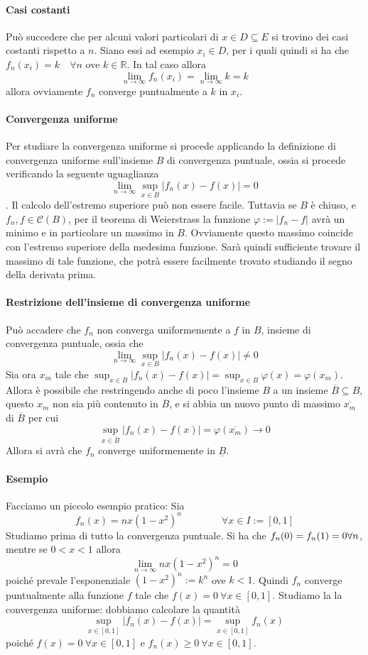 \documentclass[a4paper,12pt]{article}
\newcommand{\cont}{\mathscr{C}}
\begin{document}
\paragraph*{Casi costanti}
Può succedere che per alcuni valori particolari di $x\in D\subseteq E$ si trovino dei casi costanti rispetto a $n$. Siano essi ad esempio $x_i \in D$, per i quali quindi si ha che $f_n(x_i)=k \quad \forall n$  ove $k\in \mathbb{R}$. In tal caso allora 
$$\lim_{n\to\infty} f_n(x_i)=\lim_{n\to\infty} k = k $$
allora ovviamente $f_n$ converge puntualmente a $k$ in $x_i$.
\paragraph*{Convergenza uniforme}
Per studiare la convergenza uniforme si procede applicando la definizione di convergenza uniforme sull'insieme $B$ di convergenza puntuale, ossia si procede verificando la seguente uguaglianza
$$\lim_{n\to\infty} \sup_{x\in B} |f_n(x)- f(x)|=0$$.
Il calcolo dell'estremo superiore può non essere facile. Tuttavia se $B$ è chiuso, e $f_n, f \in\cont(B)$,   per il teorema di Weierstrass la funzione $\varphi:=|f_n-f|$ avrà un minimo e in particolare un massimo in $B$. Ovviamente questo massimo coincide con l'estremo superiore della medesima funzione. Sarà quindi sufficiente trovare il massimo di tale funzione, che potrà essere facilmente trovato studiando il segno della derivata prima.
\paragraph*{Restrizione dell'insieme di convergenza uniforme}
Può accadere che $f_n$ non converga uniformemente a $f$ in $B$, insieme di convergenza puntuale, ossia che 
$$\lim_{n\to\infty} \sup_{x\in B} |f_n(x)- f(x)|\neq 0$$
Sia ora $x_m$ tale che $\sup_{x\in B} |f_n(x)- f(x)|=\sup_{x\in B} \varphi(x)=\varphi (x_m)$. Allora è possibile che restringendo anche di poco l'insieme $B$ a un insieme $\overline{B}\subseteq B$, questo $x_m$ non sia più contenuto in $\overline{B}$, e si abbia un nuovo punto di massimo $\overline{x_m}$ di $\overline{B}$ per cui 
$$ \sup_{x\in \overline{B}} |f_n(x)- f(x)|=\varphi(\overline{x_m})\to 0 $$
Allora si avrà che $f_n$ converge uniformemente in $\underline{B}$.
\paragraph*{Esempio}
Facciamo un piccolo esempio pratico:
Sia $$f_n(x)= nx(1-x^2)^n \qquad \qquad \forall x\in I:=[0,1]$$
Studiamo prima di tutto la convergenza puntuale.
Si ha che $f_n(0)=f_n(1)=0 \\ \forall n$, mentre se $0<x<1$ allora 
$$\lim_{n\to\infty}nx(1-x^2)^n=0$$
poiché prevale l'esponenziale $(1-x^2)^n:=k^n$ ove $k<1$.
Quindi $f_n $ converge puntualmente alla funzione $f$ tale che $f(x)=0 \ \forall x \in[0,1]$.
Studiamo la la convergenza uniforme: dobbiamo calcolare la quantità
$$\sup_{x\in[0,1]}|f_n(x)-f(x)|=\sup_{x\in[0,1]}f_n(x)$$ 
poiché $f(x)=0 \ \forall x \in [0,1]$ e $f_n(x)\geq0 \ \forall x \in [0,1]$.
\end{document}
